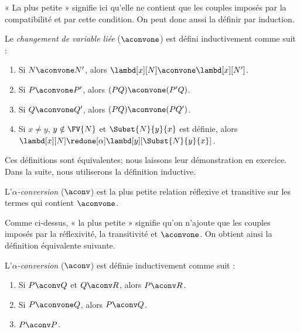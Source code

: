 \documentclass[../../../include/open-logic-section]{subfiles}
\begin{document}
« La plus petite » signifie ici qu'elle ne
contient que les couples imposés par la
compatibilité et par cette condition. On
peut donc aussi la définir par induction.

\begin{defn}
Le \emph{changement de variable liée}
($\aconvone$) est défini inductivement
comme suit :
\begin{enumerate}
\item Si $N \aconvone N'$, alors
  $\lambd[x][N] \aconvone \lambd[x][N']$.
\item Si $P \aconvone P'$, alors
  $(PQ) \aconvone (P'Q)$.
\item Si $Q \aconvone Q'$, alors
  $(PQ) \aconvone (PQ')$.
\item Si $x \neq y$, $y \notin \FV{N}$ et
  $\Subst{N}{y}{x}$ est définie, alors
  $\lambd[x][N] \redone[\alpha]
  \lambd[y][\Subst{N}{y}{x}]$.
\end{enumerate}
\end{defn}

Ces définitions sont équivalentes; nous
laissons leur démonstration en exercice.
Dans la suite, nous utiliserons la
définition inductive.

\begin{defn}
L'\emph{$\alpha$-conversion} ($\aconv$)
est la plus petite relation réflexive et
transitive sur les termes qui contient
$\aconvone$.
\end{defn}

Comme ci-dessus, « la plus petite » signifie
qu'on n'ajoute que les couples imposés par
la réflexivité, la transitivité et
$\aconvone$. On obtient ainsi la définition
équivalente suivante.

\begin{defn}
L'\emph{$\alpha$-conversion} ($\aconv$)
est définie inductivement comme suit :
\begin{enumerate}
\item Si $P \aconv Q$ et $Q \aconv R$,
  alors $P \aconv R$.
\item Si $P \aconvone Q$, alors
  $P \aconv Q$.
\item $P \aconv P$.
\end{enumerate}
\end{defn}
\end{document}
